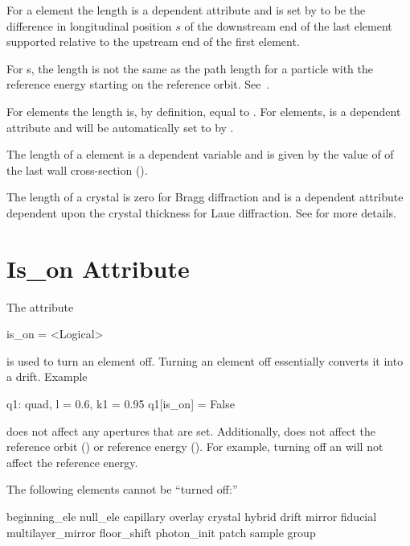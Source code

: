 For a  element the length  is a dependent attribute and is set by \bmad to be the
difference in longitudinal position $s$ of the downstream end of the last element supported relative
to the upstream end of the first element.

For s, the length  is not the same as the path length for a particle with the
reference energy starting on the reference orbit. See~.

For  elements the  length is, by definition, equal to . For 
elements,  is a dependent attribute and will be automatically set to  by \bmad.

The length of a  element is a dependent variable and is given by the value of 
of the last wall cross-section ().

The length of a crystal is zero for Bragg diffraction and is a dependent attribute dependent upon
the crystal thickness for Laue diffraction. See  for more details.

\section{Is_on Attribute}
\label{s:is.on}

The  attribute
\begin{example}
  is_on = <Logical>
\end{example}
is used to turn an element off. Turning
an element off essentially converts it into a drift.
Example
\begin{example}
  q1: quad, l = 0.6, k1 = 0.95
  q1[is_on] = False
\end{example}

 does not affect any apertures that are set. Additionally,  does not affect the
reference orbit () or reference energy (). For example, turning off an
 will not affect the reference energy.

The following elements cannot be ``turned off:''
\begin{example}
  beginning_ele       null_ele
  capillary           overlay
  crystal             hybrid
  drift               mirror
  fiducial            multilayer_mirror
  floor_shift         photon_init
  patch               sample
  group
\end{example}

